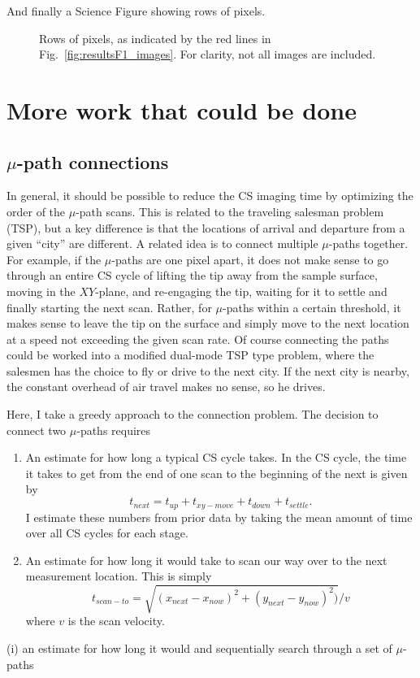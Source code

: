 \documentclass[11pt]{article}
\begin{document}
And finally a Science Figure showing rows of pixels.

\begin{figure}
    
    \caption{Rows of pixels, as indicated by the red lines in Fig.~\ref{fig:resultsF1_images}. For clarity, not all images are included.}  
    \label{fig: }
\end{figure}

\section{More work that could be done}
\subsection{$\mu$-path connections}
In general, it should be possible to reduce the CS imaging time by optimizing the order of the $\mu$-path scans. This is related to the traveling salesman problem (TSP), but a key difference is that the locations of arrival and departure from a given ``city'' are different. A related idea is to connect multiple $\mu$-paths together. For example, if the $\mu$-paths are one pixel apart, it does not make sense to go through an entire CS cycle of lifting the tip away from the sample surface, moving in the $XY$-plane, and re-engaging the tip, waiting for it to settle and finally starting the next scan. Rather, for $\mu$-paths within a certain threshold, it makes sense to leave the tip on the surface and simply move to the next location at a speed not exceeding the given scan rate. Of course connecting the paths could be worked into a modified dual-mode TSP type problem, where the salesmen has the choice to fly or drive to the next city. If the next city is nearby, the constant overhead of air travel makes no sense, so he drives.

Here, I take a greedy approach to the connection problem. The decision to connect two $\mu$-paths requires
\begin{enumerate}
\item An estimate for how long a typical CS cycle takes. In the CS cycle, the time it takes to get from the end of one scan to the beginning of the next is given by
  \begin{equation}
    t_{next} = t_{up} + t_{xy-move} + t_{down} + t_{settle}.
  \end{equation}
  I estimate these numbers from prior data by taking the mean amount of time over all CS cycles for each stage.
\item An estimate for how long it would take to scan our way over to the next measurement location. This is simply
  \begin{equation}
    t_{scan-to} = \sqrt{(x_{next}-x_{now})^2 + (y_{next}-y_{now})^2) }/ v
    \end{equation}
    where $v$ is the scan velocity.
\end{enumerate}
(i) an estimate for how long it would and sequentially search through a set of $\mu$-paths
\end{document}
